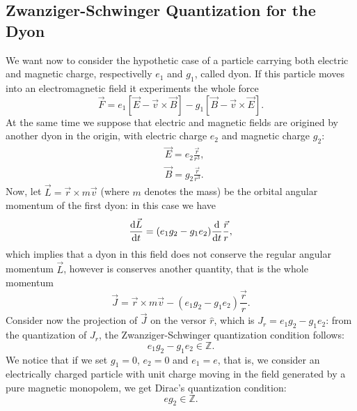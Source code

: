 \documentclass[main.tex]{subfiles}
\begin{document}
\subsection{Zwanziger-Schwinger Quantization for the Dyon}
We want now to consider the hypothetic case of a particle carrying both electric and magnetic charge, respectivelly $e_1$ and $g_1$, called dyon. If this particle moves into an electromagnetic field it experiments the whole force
\begin{equation}
\vec F=e_1\left[\vec E-\vec v\times\vec B\right]-g_1\left[\vec B-\vec v\times\vec E\right].
\end{equation}
At the same time we suppose that electric and magnetic fields are origined by another dyon in the origin, with electric charge $e_2$ and magnetic charge $g_2$:
\begin{align}
&\vec E=e_2\frac{\vec r}{r^3},\nonumber\\
&\vec B=g_2\frac{\vec r}{r^3}.
\end{align}
Now, let $\vec L=\vec r\times m\vec v$ (where $m$ denotes the mass) be the orbital angular momentum of the first dyon: in this case we have
\begin{equation}
\dv{\vec{L}}{t}
=(e_1g_2-g_1e_2)
\dv{}{t}
\frac{\vec r}{r},
\end{equation}
which implies that a dyon in this field does not conserve the regular angular momentum $\vec L$, however is conserves another quantity, that is the whole momentum
\begin{equation}
\vec J=\vec r\times m\vec v-(e_1g_2-g_1e_2)\frac{\vec r}{r}.
\end{equation}
Consider now the projection of $\vec J$ on the versor $\hat r$, which is $J_r=e_1g_2-g_1e_2$: from the quantization of $J_r$, the Zwanziger-Schwinger quantization condition follows:
\begin{equation}
e_1g_2-g_1e_2\in\mathbb{Z}.
\end{equation}
We notice that if we set $g_1=0$, $e_2=0$ and $e_1 = e$, that is, we consider an electrically charged particle with unit charge moving in the field generated by a pure magnetic monopolem, we get Dirac's quantization condition:
\begin{equation}
e g_2\in\mathbb{Z}.
\end{equation}

\end{document}
